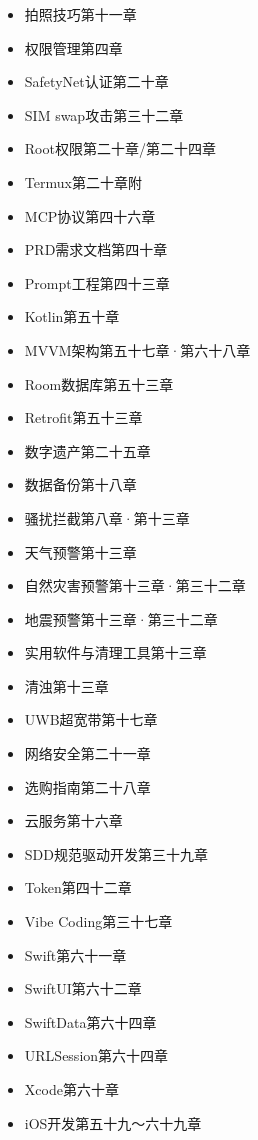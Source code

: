 
\begin{itemize}
  \item 拍照技巧第十一章
  \item 权限管理第四章
  \item SafetyNet认证第二十章
  \item SIM swap攻击第三十二章
  \item Root权限第二十章/第二十四章
  \item Termux第二十章附
  \item MCP协议第四十六章
  \item PRD需求文档第四十章
  \item Prompt工程第四十三章
  \item Kotlin第五十章
  \item MVVM架构第五十七章·第六十八章
  \item Room数据库第五十三章
  \item Retrofit第五十三章
\end{itemize}


\begin{itemize}
  \item 数字遗产第二十五章
  \item 数据备份第十八章
  \item 骚扰拦截第八章·第十三章
  \item 天气预警第十三章
  \item 自然灾害预警第十三章·第三十二章
  \item 地震预警第十三章·第三十二章
  \item 实用软件与清理工具第十三章
  \item 清浊第十三章
  \item UWB超宽带第十七章
  \item 网络安全第二十一章
  \item 选购指南第二十八章
  \item 云服务第十六章
  \item SDD规范驱动开发第三十九章
  \item Token第四十二章
  \item Vibe Coding第三十七章
  \item Swift第六十一章
  \item SwiftUI第六十二章
  \item SwiftData第六十四章
  \item URLSession第六十四章
  \item Xcode第六十章
  \item iOS开发第五十九～六十九章
\end{itemize}

